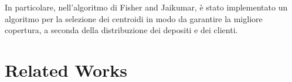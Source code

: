 \documentclass[]{article}
\begin{document}
In particolare, nell'algoritmo di Fisher and Jaikumar, è stato implementato un algoritmo per la selezione dei centroidi in modo da garantire la migliore copertura, a seconda della distribuzione dei depositi e dei clienti.







\section{Related Works}
\end{document}

